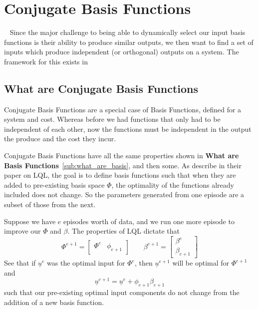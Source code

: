 
\FloatBarrier\section{Conjugate Basis Functions}
~\label{sec:conjugate_basis_functions}
Since the major challenge to being able to dynamically select our input basis functions is their ability to produce similar outputs, we then want to find a set of inputs which produce independent (or orthogonal) outputs on a system. The framework for this exists in 

\FloatBarrier\subsection{What are Conjugate Basis Functions}
Conjugate Basis Functions are a special case of Basis Functions, defined for a system and cost. Whereas before we had functions that only had to be independent of each other, now the functions must be independent in the output the produce and the cost they incur. 

Conjugate Basis Functions have all the same properties shown in \textbf{What are Basis Functions}~\ref{sub:what_are_basis}, and then some. As  describe in their paper on \ac{LQL}, the goal is to define basis functions such that when they are added to pre-existing basis space $\Phi$, the optimality of the functions already included does not change. So the parameters generated from one episode are a subset of those from the next.

Suppose we have $e$ episodes worth of data, and we run one more episode to improve our $\Phi$ and $\beta$. The properties of LQL dictate that
\begin{equation}
    \Phi^{e+1} = \begin{bmatrix}
        \Phi^e & \phi_{e+1}
    \end{bmatrix}
    \quad\quad
    \beta^{e+1} = \begin{bmatrix}
        \beta^e \\ \beta_{e+1}
    \end{bmatrix}
    \label{eq:conjugate_subspace}
\end{equation}
See that if $\underline{u}^e$ was the optimal input for $\Phi^e$, then $\underline{u}^{e+1}$ will be optimal for $\Phi^{e+1}$ and
\begin{equation}
    \underline{u}^{e+1} = \underline{u}^e + \phi_{e+1}\beta_{e+1}
\end{equation}
such that our pre-existing optimal input components do not change from the addition of a new basis function. 

